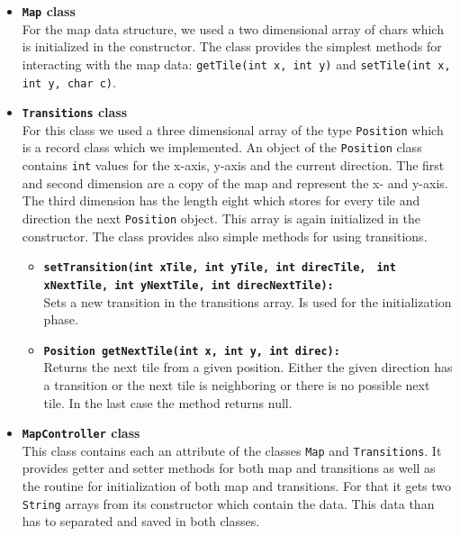 \begin{itemize}
    \item \textbf{\texttt{Map} class}\\
    For the map data structure, we used a two dimensional array of chars which is initialized in the constructor. The class provides the simplest methods for interacting with the map data: \texttt{getTile(int x, int y)} and \texttt{setTile(int x, int y, char c)}.
    
    \item \textbf{\texttt{Transitions} class}\\
    For this class we used a three dimensional array of the type \texttt{Position} which is a record class which we implemented. An object of the \texttt{Position} class contains \texttt{int} values for the x-axis, y-axis and the current direction. The first and second dimension are a copy of the map and represent the x- and y-axis. The third dimension has the length eight which stores for every tile and direction the next \texttt{Position} object. This array is again initialized in the constructor. The class provides also simple methods for using transitions.
    \begin{itemize}
        \item \textbf{\texttt{setTransition(int xTile, int yTile, int direcTile,}} \newline \textbf{\texttt{ int xNextTile, int yNextTile, int direcNextTile):}}\\
        Sets a new transition in the transitions array. Is used for the initialization phase.
        
        \item \textbf{\texttt{Position getNextTile(int x, int y, int direc):}}\\
        Returns the next tile from a given position. Either the given direction has a transition or the next tile is neighboring or there is no possible next tile. In the last case the method returns null.
    \end{itemize}
    
    \item \textbf{\texttt{MapController} class}\\
    This class contains each an attribute of the classes \texttt{Map} and \texttt{Transitions}. It provides getter and setter methods for both map and transitions as well as the routine for initialization of both map and transitions. For that it gets two \texttt{String} arrays from its constructor which contain the data. This data than has to separated and saved in both classes.
\end{itemize}
